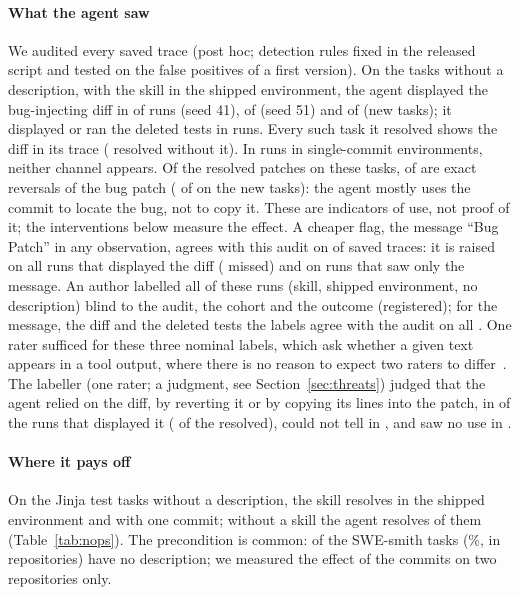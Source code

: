 \documentclass[sigconf,review,anonymous]{acmart}
\begin{document}
\paragraph{What the agent saw}
We audited every saved trace (post hoc; detection rules fixed in the released script and tested on
the false positives of a first version). On the tasks without a description, with the skill in the
shipped environment, the agent displayed the bug-injecting diff in \nhiStudyDiffA{} of
\nhiStudyNA{} runs (seed 41), \nhiStudyDiffB{} of \nhiStudyNA{} (seed 51) and \nhiStudyDiffC{} of
\nhiStudyNC{} (new tasks); it displayed or ran the deleted tests in \nhiStudyTests{} runs. Every
such task it resolved shows the diff in its trace (\nhiStudyResNone{} resolved without it). In
\nhiSingleRuns{} runs in single-commit environments, neither channel appears. Of the resolved
patches on these tasks, \nrvShipNoIssue{} of \nrvShipNoIssueN{} are exact reversals of the bug
patch (\nrvUnseen{} of \nrvUnseenN{} on the new tasks): the agent mostly uses the commit to locate
the bug, not to copy it. These are indicators of use, not proof of it; the interventions below
measure the effect. A cheaper flag, the message ``Bug Patch'' in any observation, agrees with this
audit on \nmonConfAgree{} of \nmonConfN{} saved traces: it is raised on all \nmonConfTP{} runs that
displayed the diff (\nmonConfFN{} missed) and on \nmonConfFP{} runs that saw only the message. An
author labelled all \nxhN{} of these runs (skill, shipped environment, no description) blind to the
audit, the cohort and the outcome (registered); for the message, the diff and the deleted tests the
labels agree with the audit on all \nxhAgreeMin{}. One rater sufficed for these three nominal labels,
which ask whether a given text appears in a tool output, where there is no reason to expect two
raters to differ~\cite{sigsoft_irr_supplement}. The labeller (one rater; a judgment, see Section~\ref{sec:threats}) judged that the agent relied on the
diff, by reverting it or by copying its lines into the patch, in \nxhUse{} of the \nxhDiff{} runs
that displayed it (\nxhUseRes{} of the \nxhResWithDiff{} resolved), could not tell in
\nxhUnclear{}, and saw no use in \nxhNoUse{}.

\paragraph{Where it pays off}
On the \njinjaNoPSTasks{} Jinja test tasks without a description, the skill resolves
\njinjaNoPSn{} in the shipped environment and \njinjaNoPSLF{} with one commit; without a skill the
agent resolves \njinjaNoPSNoneBase{} of them (Table~\ref{tab:nops}). The precondition is
common: \nexpoEmpty{} of the \nexpoTasks{} SWE-smith tasks (\nexpoPct\%, in \nexpoRepos{}
repositories) have no description; we measured the effect of the commits on two repositories only.
\end{document}
